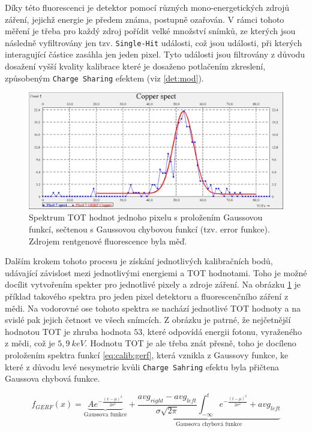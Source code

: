 Díky této fluorescenci je detektor pomocí různých mono-energetických zdrojů záření, jejichž energie je předem známa, postupně ozařován. V rámci tohoto měření je třeba pro každý zdroj pořídit velké množství snímků, ze kterých jsou následně vyfiltrovány jen tzv. \texttt{Single-Hit} události, což jsou události, při kterých interagující částice zasáhla jen jeden pixel. Tyto události jsou filtrovány z důvodu dosažení vyšší kvality kalibrace které je dosaženo potlačením zkreslení, způsobeným \texttt{Charge Sharing} efektem (viz \ref{det:mod}).

\begin{figure}[th]
	\begin{center}
		\includegraphics[width=14cm]{figures/calib_gerf.png}
		\caption{Spektrum TOT hodnot jednoho pixelu s proložením Gaussovou funkcí, sečtenou s Gaussovou chybovou funkcí (tzv. error funkce). Zdrojem rentgenové fluorescence byla měď.}
		\label{fig:calib:gerf}
	\end{center}
\end{figure}

Dalším krokem tohoto procesu je získání jednotlivých kalibračních bodů, udávající závislost mezi jednotlivými energiemi a TOT hodnotami. Toho je možné docílit vytvořením spekter pro jednotlivé pixely a zdroje záření. Na obrázku \ref{fig:calib:gerf} je příklad takového spektra pro jeden pixel detektoru a fluorescenčního záření z mědi. Na vodorovné ose tohoto spektra se nachází jednotlivé TOT hodnoty a na svislé pak jejich četnost ve všech snímcích. Z obrázku je patrné, že nejčetnější hodnotou TOT je zhruba hodnota $53$, které odpovídá energii fotonu, vyraženého z mědi, což je $5,9~keV$. Hodnotu TOT je ale třeba znát přesně, toho je docíleno proložením spektra funkcí \ref{eq:calib:gerf}, která vznikla z Gaussovy funkce, ke které z důvodu levé nesymetrie kvůli \texttt{Charge Sahring} efektu byla přičtena Gaussova chybová funkce. 

\begin{equation}\label{eq:calib:gerf}
	f_{GERF}(x) = \underbrace{Ae^{ -\frac{(x-\mu)^2}{2\sigma^2} }}_{\text{Gaussova funkce}} +
	\underbrace{ \frac{avg_{right} - avg_{left}}{\sigma\sqrt{2\pi}} \int_{-\infty}^t e^{ -\frac{(t-\mu)^2}{2\sigma^2} } + avg_{left}}_{\text{Gaussova chybová funkce}}
\end{equation}

